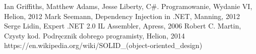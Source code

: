 \documentclass[12pt]{article}
\begin{document}
\newpage
\listoffigures
\listoftables

\newpage
\begin{thebibliography}{authordate1}
 Ian Griffiths, Matthew Adams, Jesse Liberty, C\#. Programowanie, Wydanie VI, Helion, 2012
 Mark Seemann, Dependency Injection in .NET, Manning, 2012
 Serge Lidin, Expert .NET 2.0 IL Assembler, Apress, 2006
 Robert C. Martin, Czysty kod. Podręcznik dobrego programisty, Helion, 2014
 https://en.wikipedia.org/wiki/SOLID\_(object-oriented\_design)
\end{thebibliography}
\end{document}
